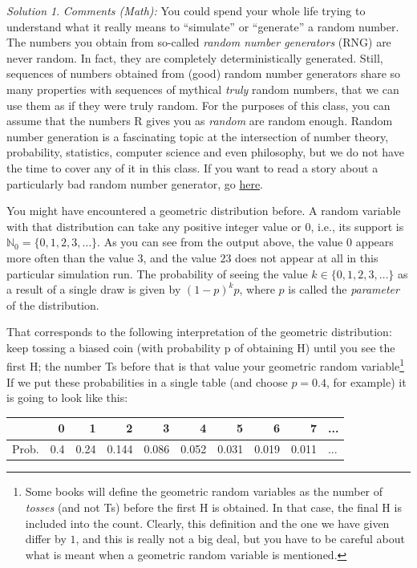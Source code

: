 \documentclass[
]{book}
\theoremstyle{definition}
\theoremstyle{definition}
\theoremstyle{definition}
\theoremstyle{definition}
\theoremstyle{remark}
\newtheorem*{solution}{Solution}
\begin{document}
\begin{solution}
\emph{Comments (Math):}
You could spend your whole life trying to understand what it really means to
``simulate'' or ``generate'' a random number. The numbers you obtain from so-called
\emph{random number generators} (RNG) are never random. In fact, they are completely
deterministically generated. Still, sequences of numbers obtained from (good)
random number generators share so many properties with sequences of mythical
\emph{truly} random numbers, that we can use them as if they were truly random. For
the purposes of this class, you can assume that the numbers R gives you as
\emph{random} are random enough. Random number generation is a fascinating topic at
the intersection of number theory, probability, statistics, computer science and
even philosophy, but we do not have the time to cover any of it in this class.
If you want to read a story about a particularly bad random number generator, go
\href{https://en.wikipedia.org/wiki/RANDU}{here}.
\end{solution}

You might have encountered a geometric distribution before. A random variable with that
distribution can take any positive integer value or \(0\), i.e., its support is
\({\mathbb N}_0=\{0,1,2,3,\dots\}\).
As you can see from the output above, the value \(0\) appears more often than the value \(3\),
and the value \(23\) does not appear at all in this particular simulation run. The
probability of seeing the value \(k\in \{0,1,2,3,\dots\}\) as a result of a single
draw is given by \((1-p)^k p\), where \(p\) is called the \emph{parameter} of the distribution.

That corresponds to the following interpretation of the geometric distribution:
keep tossing a biased coin (with probability p of obtaining H) until you see the first H; the number Ts before that is that value your geometric random variable\footnote{Some books will define the geometric random variables as the number of \emph{tosses} (and not Ts) before the first H is obtained. In that case, the final H is included into the count. Clearly, this definition and the one we have given differ by \(1\), and this is really not a big deal, but you have to be careful about what is meant when a geometric random variable is mentioned.}
If we put these probabilities in a single table (and choose \(p=0.4\), for example) it is
going to look like this:

\begin{tabular}{l|r|r|r|r|r|r|r|r|l}
\hline
  & 0 & 1 & 2 & 3 & 4 & 5 & 6 & 7 & ...\\
\hline
Prob. & 0.4 & 0.24 & 0.144 & 0.086 & 0.052 & 0.031 & 0.019 & 0.011 & ...\\
\hline
\end{tabular}
\end{document}
